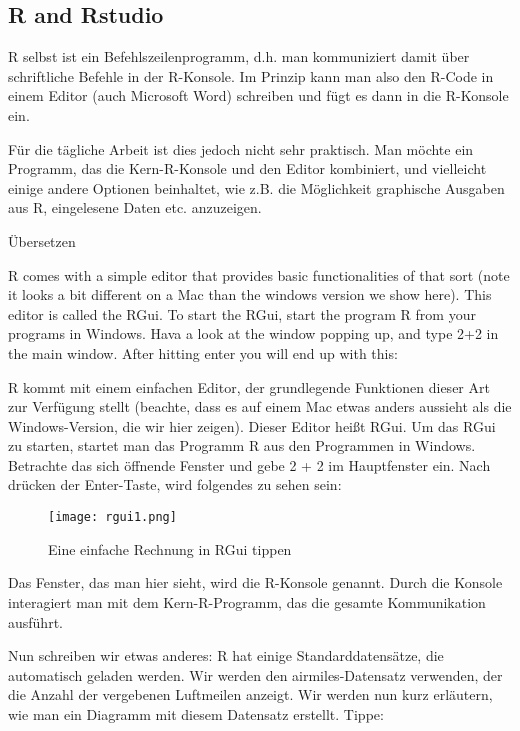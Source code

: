 \documentclass[a4paper,twoside]{tufte-book}\usepackage[]{graphicx}\usepackage[]{color}
\begin{document}
\begin{Anhang}

\chapter{R and Rstudio}

R selbst ist ein Befehlszeilenprogramm, d.h. man kommuniziert damit über schriftliche Befehle in der R-Konsole. Im Prinzip kann man also den R-Code in einem Editor (auch Microsoft Word) schreiben und fügt es dann in die R-Konsole ein.

Für die tägliche Arbeit ist dies jedoch nicht sehr praktisch. Man möchte ein Programm, das die Kern-R-Konsole und den Editor kombiniert, und vielleicht einige andere Optionen beinhaltet, wie z.B. die Möglichkeit graphische Ausgaben aus R, eingelesene Daten etc. anzuzeigen. 

Übersetzen

R comes with a simple editor that provides basic functionalities of that sort (note it looks a bit different on a Mac than the windows version we show here). This editor is called the RGui. To start the RGui, start the program R from your programs in Windows. Hava a look at the window popping up, and type 2+2 in the main window. After hitting enter you will end up with this:

R kommt mit einem einfachen Editor, der grundlegende Funktionen dieser Art zur Verfügung stellt (beachte, dass es auf einem Mac etwas anders aussieht als die Windows-Version, die wir hier zeigen). Dieser Editor heißt RGui. Um das RGui zu starten, startet man das Programm R aus den Programmen in Windows. Betrachte das sich öffnende Fenster und gebe 2 + 2 im Hauptfenster ein. Nach drücken der Enter-Taste, wird folgendes zu sehen sein:

\begin{figure}[]
\begin{center}
\texttt{[image: rgui1.png]}
\caption{Eine einfache Rechnung in RGui tippen}
\label{fig: Rgui1}
\end{center}
\end{figure}


Das Fenster, das man hier sieht, wird die R-Konsole genannt. Durch die Konsole interagiert man mit dem Kern-R-Programm, das die gesamte Kommunikation ausführt.

Nun schreiben wir etwas anderes: R hat einige Standarddatensätze, die automatisch geladen werden. Wir werden den airmiles-Datensatz verwenden, der die Anzahl der vergebenen Luftmeilen anzeigt. Wir werden nun kurz erläutern, wie man ein Diagramm mit diesem Datensatz erstellt. Tippe:


\end{Anhang}
\end{document}
